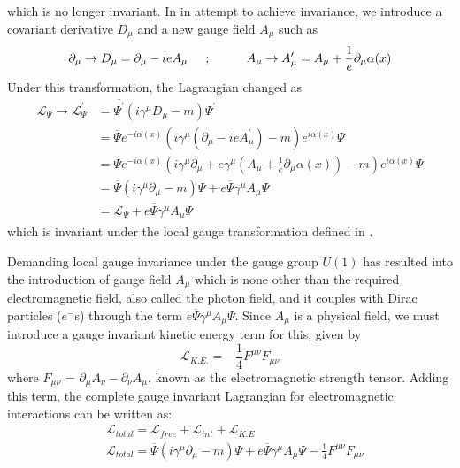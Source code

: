 which is no longer invariant. In in attempt to achieve invariance, we introduce a covariant derivative $D_{\mu}$ and a new gauge field $A_{\mu}$ such as
\begin{equation}
\partial_{\mu} \rightarrow D_{\mu} = \partial_{\mu} - ieA_{\mu} \hspace{0.2 in} ; \hspace{0.4 in} A_{\mu} \rightarrow A^{\prime}_{\mu} = A_{\mu} + \frac{1}{e}\partial_{\mu}\alpha(x)
\label{eg:delToD}
\end{equation}
Under this transformation, the Lagrangian changed as
\begin{equation}
\begin{split}
  \mathcal{L}_{\Psi} \rightarrow \mathcal{L}^{\prime}_{\Psi} & = \overline{\Psi^{\prime}}(i\gamma^{\mu}D_{\mu} - m){\Psi^{\prime}} \\
  & = \overline{\Psi}e^{-i\alpha(x)}(i\gamma^{\mu}(\partial_{\mu} - ieA^{\prime}_{\mu}) - m)e^{i\alpha(x)}{\Psi} \\
  & = \overline{\Psi}e^{-i\alpha(x)}(i\gamma^{\mu}\partial_{\mu} + e\gamma^{\mu}(A_{\mu} + \frac{1}{e}\partial_{\mu}\alpha(x)) - m)e^{i\alpha(x)}{\Psi} \\
  & = \overline{\Psi}(i\gamma^{\mu}\partial_{\mu} - m){\Psi} + e\overline{\Psi}\gamma^{\mu}A_{\mu}{\Psi} \\
  & = \mathcal{L}_{\Psi} + e\overline{\Psi}\gamma^{\mu}A_{\mu}{\Psi}
  \label{eg:newLang}
\end{split}
\end{equation}
which is invariant under the local gauge transformation defined in \eqn{\ref{eg:Localphase}}.

Demanding local gauge invariance under the gauge group $U (1)$ has resulted into the introduction of gauge field $A_{\mu}$ which is none other than the required
electromagnetic field, also called the photon field, and it couples with Dirac particles ($e^{-}$s) through the term $e\overline{\Psi}\gamma^{\mu}A_{\mu}{\Psi}$. Since $A_{\mu}$ is a physical field, we
must introduce a gauge invariant kinetic energy term for this, given by 
\begin{equation}
  \mathcal{L}_{K.E.} = -\frac{1}{4}F^{\mu\nu}F_{\mu\nu}
  \label{eg:Lke}
\end{equation}
where $F_{\mu\nu}$ = $\partial_{\mu}A_{\nu} - \partial_{\nu}A_{\mu}$, known as the electromagnetic strength tensor. Adding this term, the complete gauge invariant
Lagrangian for electromagnetic interactions can be written as:
\begin{equation}
  \begin{split}
  & \mathcal{L}_{total} = \mathcal{L}_{free} + \mathcal{L}_{int} + \mathcal{L}_{K.E} \\
  & \mathcal{L}_{total} = \overline{\Psi}(i\gamma^{\mu}\partial_{\mu} - m){\Psi} + e\overline{\Psi}\gamma^{\mu}A_{\mu}{\Psi} - \frac{1}{4}F^{\mu\nu}F_{\mu\nu}
    \label{eg:Lcomp}
    \end{split}
\end{equation}

